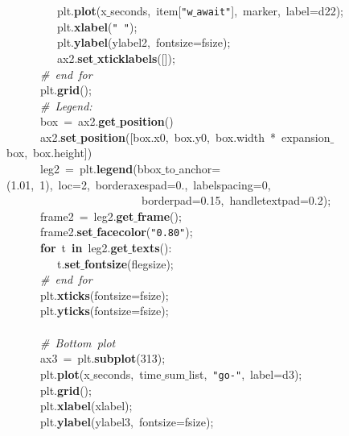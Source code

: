 \mbox{}\ \ \ \ \ \ \ \ \ plt.\textbf{plot}(x$\_$seconds,\ item[\texttt{"{}w$\_$await"{}}],\ marker,\ label=d22); \\
\mbox{}\ \ \ \ \ \ \ \ \ plt.\textbf{xlabel}(\texttt{"{}\ "{}}); \\
\mbox{}\ \ \ \ \ \ \ \ \ plt.\textbf{ylabel}(ylabel2,\ fontsize=fsize); \\
\mbox{}\ \ \ \ \ \ \ \ \ ax2.\textbf{set$\_$xticklabels}([]); \\
\mbox{}\ \ \ \ \ \ \textit{\#\ end\ for} \\
\mbox{}\ \ \ \ \ \ plt.\textbf{grid}(); \\
\mbox{}\ \ \ \ \ \ \textit{\#\ Legend:} \\
\mbox{}\ \ \ \ \ \ box\ =\ ax2.\textbf{get$\_$position}() \\
\mbox{}\ \ \ \ \ \ ax2.\textbf{set$\_$position}([box.x0,\ box.y0,\ box.width\ *\ expansion$\_$box,\ box.height]) \\
\mbox{}\ \ \ \ \ \ leg2\ =\ plt.\textbf{legend}(bbox$\_$to$\_$anchor=(1.01,\ 1),\ loc=2,\ borderaxespad=0.,\ labelspacing=0,\  \\
\mbox{}\ \ \ \ \ \ \ \ \ \ \ \ \ \ \ \ \ \ \ \ \ \ \ \ borderpad=0.15,\ handletextpad=0.2); \\
\mbox{}\ \ \ \ \ \ frame2\ =\ leg2.\textbf{get$\_$frame}(); \\
\mbox{}\ \ \ \ \ \ frame2.\textbf{set$\_$facecolor}(\texttt{"{}0.80"{}}); \\
\mbox{}\ \ \ \ \ \ \textbf{for}\ t\ \textbf{in}\ leg2.\textbf{get$\_$texts}(): \\
\mbox{}\ \ \ \ \ \ \ \ \ t.\textbf{set$\_$fontsize}(flegsize); \\
\mbox{}\ \ \ \ \ \ \textit{\#\ end\ for} \\
\mbox{}\ \ \ \ \ \ plt.\textbf{xticks}(fontsize=fsize); \\
\mbox{}\ \ \ \ \ \ plt.\textbf{yticks}(fontsize=fsize); \\
\mbox{}\ \ \ \ \ \  \\
\mbox{}\ \ \ \ \ \ \textit{\#\ Bottom\ plot} \\
\mbox{}\ \ \ \ \ \ ax3\ =\ plt.\textbf{subplot}(313); \\
\mbox{}\ \ \ \ \ \ plt.\textbf{plot}(x$\_$seconds,\ time$\_$sum$\_$list,\ \texttt{"{}go-"{}},\ label=d3); \\
\mbox{}\ \ \ \ \ \ plt.\textbf{grid}(); \\
\mbox{}\ \ \ \ \ \ plt.\textbf{xlabel}(xlabel); \\
\mbox{}\ \ \ \ \ \ plt.\textbf{ylabel}(ylabel3,\ fontsize=fsize); \\
